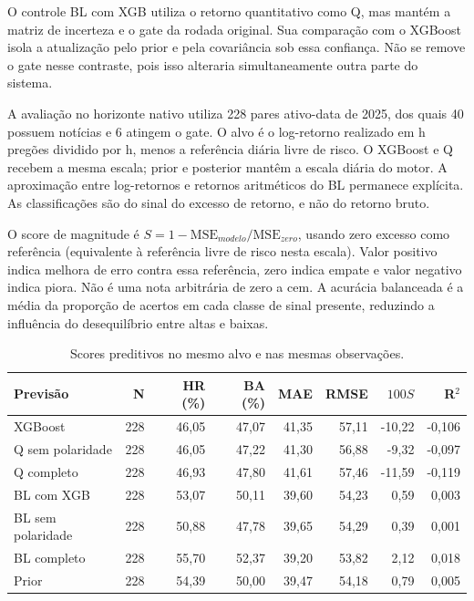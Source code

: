 O controle BL com XGB utiliza o retorno quantitativo como Q, mas mantém a matriz de incerteza e o gate da rodada original. Sua comparação com o XGBoost isola a atualização pelo prior e pela covariância sob essa confiança. Não se remove o gate nesse contraste, pois isso alteraria simultaneamente outra parte do sistema.

A avaliação no horizonte nativo utiliza 228 pares ativo-data de 2025, dos quais 40 possuem notícias e 6 atingem o gate. O alvo é o log-retorno realizado em h pregões dividido por h, menos a referência diária livre de risco. O XGBoost e Q recebem a mesma escala; prior e posterior mantêm a escala diária do motor. A aproximação entre log-retornos e retornos aritméticos do BL permanece explícita. As classificações são do sinal do excesso de retorno, e não do retorno bruto.

O score de magnitude é $S=1-\mathrm{MSE}_{modelo}/\mathrm{MSE}_{zero}$, usando zero excesso como referência (equivalente à referência livre de risco nesta escala). Valor positivo indica melhora de erro contra essa referência, zero indica empate e valor negativo indica piora. Não é uma nota arbitrária de zero a cem. A acurácia balanceada é a média da proporção de acertos em cada classe de sinal presente, reduzindo a influência do desequilíbrio entre altas e baixas.

\begin{table}[H]\centering
\caption{Scores preditivos no mesmo alvo e nas mesmas observações.}
{\footnotesize\begin{tabular}{lrrrrrrr}\hline
Previsão & N & HR (\%) & BA (\%) & MAE & RMSE & $100S$ & R$^2$\\ \hline
XGBoost & 228 & 46,05 & 47,07 & 41,35 & 57,11 & -10,22 & -0,106\\
Q sem polaridade & 228 & 46,05 & 47,22 & 41,30 & 56,88 & -9,32 & -0,097\\
Q completo & 228 & 46,93 & 47,80 & 41,61 & 57,46 & -11,59 & -0,119\\
BL com XGB & 228 & 53,07 & 50,11 & 39,60 & 54,23 & 0,59 & 0,003\\
BL sem polaridade & 228 & 50,88 & 47,78 & 39,65 & 54,29 & 0,39 & 0,001\\
BL completo & 228 & 55,70 & 52,37 & 39,20 & 53,82 & 2,12 & 0,018\\
Prior & 228 & 54,39 & 50,00 & 39,47 & 54,18 & 0,79 & 0,005\\
\hline\end{tabular}}\par{}\end{table}

